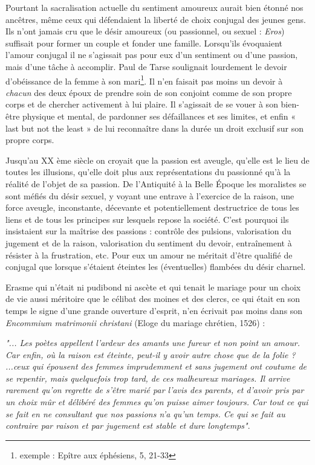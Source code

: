  
 
 
 Pourtant la sacralisation actuelle du sentiment amoureux aurait bien étonné nos ancêtres, même ceux qui défendaient la liberté de choix conjugal des jeunes gens. Ils n'ont jamais cru  que le désir amoureux (ou passionnel, ou sexuel : \emph{Eros}) suffisait pour former un couple et fonder une famille. Lorsqu'ils évoquaient l'amour conjugal il ne s'agissait pas pour eux d'un sentiment ou d'une passion, mais d'une tâche à accomplir. Paul de Tarse soulignait lourdement le devoir d'obéissance de la femme à son mari\footnote{exemple : Epître aux éphésiens, 5, 21-33}. Il n'en faisait pas moins un devoir à \emph{chacun} des deux époux de prendre soin de son conjoint comme de son propre corps et de chercher activement à lui plaire. Il s'agissait de se vouer à son bien-être physique et mental, de pardonner ses défaillances et ses limites, et enfin « last but not the least » de lui reconnaître dans la durée un droit exclusif sur son propre corps.
 
 Jusqu'au XX ème siècle on croyait que la passion est aveugle, qu'elle est le lieu de toutes les illusions, qu'elle doit plus aux représentations du passionné qu’à la réalité de l’objet de sa passion. De l'Antiquité à la Belle Époque les moralistes se sont méfiés du désir sexuel, y voyant une entrave à l'exercice de la raison, une force aveugle, inconstante, décevante et potentiellement destructrice de tous les liens et de tous les principes sur lesquels repose la société. C'est pourquoi ils insistaient sur la maîtrise des passions : contrôle des pulsions, valorisation du jugement et de la raison, valorisation du sentiment du devoir, entraînement à résister à la frustration, etc. Pour eux un amour ne méritait d'être qualifié de conjugal que lorsque s'étaient éteintes les (éventuelles) flambées du désir charnel. 



Erasme qui n'était ni pudibond ni ascète et qui tenait le mariage pour un choix de vie aussi méritoire que le célibat des moines et des clercs, ce qui était en son temps le signe d'une grande ouverture d'esprit, n'en écrivait pas moins dans son \emph{Encommium matrimonii christani} (Eloge du mariage chrétien, 1526) : 

\begin{displayquote}
\emph{"... Les poètes appellent l'ardeur des amants une fureur et non point un amour. Car enfin, où la raison est éteinte, peut-il y avoir autre chose que de la folie ? ...ceux qui épousent des femmes imprudemment et sans jugement ont coutume de se repentir, mais quelquefois trop tard, de ces malheureux mariages. Il arrive rarement qu'on regrette de s'être marié par l'avis des parents, et d'avoir pris par un choix mûr et délibéré des femmes qu'on puisse aimer toujours. Car tout ce qui se fait en ne consultant que nos passions n'a qu'un temps. Ce qui se fait au contraire par raison et par jugement est stable et dure longtemps"}.  
\end{displayquote}

